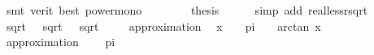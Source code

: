 \begin{isabellebody}
\ {\isacharparenleft}{\kern0pt}smt\ {\isacharparenleft}{\kern0pt}verit{\isacharcomma}{\kern0pt}\ best{\isacharparenright}{\kern0pt}\ power{\isacharunderscore}{\kern0pt}mono{\isacharparenright}{\kern0pt}\isanewline
\ \ \isamarkupfalse%
\isanewline
\ \ \isamarkupfalse%
\ \isamarkupfalse%
\ {\isacharquery}{\kern0pt}thesis\isanewline
\ \ \ \ \isamarkupfalse%
\ {\isacharparenleft}{\kern0pt}simp\ add{\isacharcolon}{\kern0pt}\ real{\isacharunderscore}{\kern0pt}less{\isacharunderscore}{\kern0pt}rsqrt{\isacharparenright}{\kern0pt}\isanewline
{}\isamarkupfalse%
%
\endisatagproof
{\isafoldproof}%
%
\isadelimproof
\isanewline
%
\endisadelimproof
\isanewline
{}\isamarkupfalse%
\ {\isachardoublequoteopen}sqrt\ {}\ {\isacharplus}{\kern0pt}\ sqrt\ {}\ {\isacharless}{\kern0pt}\ sqrt\ {}{}{\isachardoublequoteclose}\isanewline
%
\isadelimproof
\ \ %
\endisadelimproof
%
\isatagproof
{}\isamarkupfalse%
\ {\isacharparenleft}{\kern0pt}approximation\ {}{}{\isacharparenright}{\kern0pt}%
\endisatagproof
{\isafoldproof}%
%
\isadelimproof
\isanewline
%
\endisadelimproof
\isanewline
{}\isamarkupfalse%
\ {\isachardoublequoteopen}x\ {\isasymin}\ {\isacharbraceleft}{\kern0pt}{}{\isachardot}{\kern0pt}{}{}{}{\isachardot}{\kern0pt}{\isachardot}{\kern0pt}{}{\isachardot}{\kern0pt}{}{}{}{\isacharbraceright}{\kern0pt}\ {\isasymLongrightarrow}\ {\isasymbar}pi\ {\isacharminus}{\kern0pt}\ {}\ {\isacharasterisk}{\kern0pt}\ arctan\ x{\isasymbar}\ {\isacharless}{\kern0pt}\ {}{\isachardot}{\kern0pt}{}{}{}{}{\isachardoublequoteclose}\isanewline
%
\isadelimproof
\ \ %
\endisadelimproof
%
\isatagproof
{}\isamarkupfalse%
\ {\isacharparenleft}{\kern0pt}approximation\ {}{}{\isacharparenright}{\kern0pt}%
\endisatagproof
{\isafoldproof}%
%
\isadelimproof
\isanewline
%
\endisadelimproof
\isanewline
{}\isamarkupfalse%
\ {\isachardoublequoteopen}{}{\isachardot}{\kern0pt}{}{}{}{}{}{}{}{}{}{}{}{}\ {\isacharless}{\kern0pt}\ pi{\isachardoublequoteclose}\isanewline
%
\isadelimproof
\ \ %
\endisadelimproof
%
\isatagproof
{}\isamarkupfalse%

\end{isabellebody}
